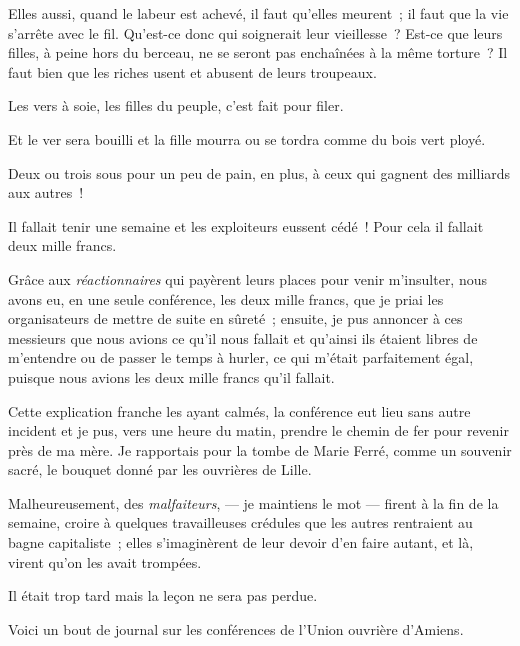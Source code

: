 \documentclass[french,twoside]{book} %
\begin{document}
Elles aussi, quand le labeur est achevé, il faut qu’elles meurent ; il faut que la vie s’arrête avec le fil. Qu’est-ce donc qui soignerait leur vieillesse ? Est-ce que leurs filles, à peine hors du berceau, ne se seront pas enchaînées à la même torture ? Il faut bien que les riches usent et abusent de leurs troupeaux.\par
Les vers à soie, les filles du peuple, c’est fait pour filer.\par
Et le ver sera bouilli et la fille mourra ou se tordra comme du bois vert ployé.\par
Deux ou trois sous pour un peu de pain, en  plus, à ceux qui gagnent des milliards aux autres !\par
Il fallait tenir une semaine et les exploiteurs eussent cédé ! Pour cela il fallait deux mille francs.\par
Grâce aux \emph{réactionnaires} qui payèrent leurs places pour venir m’insulter, nous avons eu, en une seule conférence, les deux mille francs, que je priai les organisateurs de mettre de suite en sûreté ; ensuite, je pus annoncer à ces messieurs que nous avions ce qu’il nous fallait et qu’ainsi ils étaient libres de m’entendre ou de passer le temps à hurler, ce qui m’était parfaitement égal, puisque nous avions les deux mille francs qu’il fallait.\par
Cette explication franche les ayant calmés, la conférence eut lieu sans autre incident et je pus, vers une heure du matin, prendre le chemin de fer pour revenir près de ma mère. Je rapportais pour la tombe de Marie Ferré, comme un souvenir sacré, le bouquet donné par les ouvrières de Lille.\par
Malheureusement, des \emph{malfaiteurs}, — je maintiens le mot — firent à la fin de la semaine, croire à quelques travailleuses crédules que les autres rentraient au bagne capitaliste ; elles s’imaginèrent de leur devoir d’en faire autant, et là, virent qu’on les avait trompées.\par
 Il était trop tard mais la leçon ne sera pas perdue.\par
Voici un bout de journal sur les conférences de l’Union ouvrière d’Amiens.\par
\end{document}
